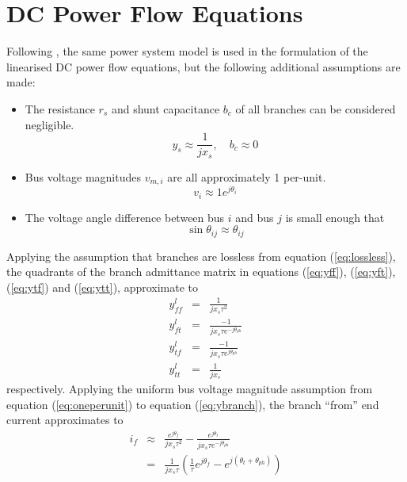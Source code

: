 \section{DC Power Flow Equations}
Following \cite[p.14]{pserc:mp_manual}, the same power system model is used in
the formulation of the linearised DC power flow equations, but the following additional assumptions are made:
\begin{itemize}
  \item The resistance $r_s$ and shunt capacitance $b_c$ of all branches can be
  considered negligible.
  \begin{equation}
  \label{eq:lossless}
  y_s \approx \frac{1}{jx_s}, \quad b_c \approx 0
  \end{equation}
  \item Bus voltage magnitudes $v_{m,i}$ are all approximately 1 per-unit.
  \begin{equation}
  \label{eq:oneperunit}
  v_i \approx 1e^{j\theta_i}
  \end{equation}
  \item The voltage angle difference between bus $i$ and bus $j$ is small enough
  that
  \begin{equation}
  \label{eq:busangdiff}
  \sin\theta_{ij} \approx \theta_{ij}
  \end{equation}
\end{itemize}
Applying the assumption that branches are lossless from equation
(\ref{eq:lossless}), the quadrants of the branch admittance matrix in equations
(\ref{eq:yff}), (\ref{eq:yft}), (\ref{eq:ytf}) and (\ref{eq:ytt}), approximate
to
\begin{eqnarray}
y_{ff}^l& =& \frac{1}{jx_s \tau^2}\\
y_{ft}^l& =& \frac{-1}{jx_s \tau e^{-j\theta_{ph}}}\\
y_{tf}^l& =& \frac{-1}{jx_s \tau e^{j\theta_{ph}}}\\
y_{tt}^l& =& \frac{1}{jx_s}
\end{eqnarray}
respectively.  Applying the uniform bus voltage magnitude assumption from
equation (\ref{eq:oneperunit}) to equation (\ref{eq:ybranch}), the branch
``from'' end current approximates to
\begin{eqnarray}
i_f& \approx& \frac{e^{j\theta_f}}{jx_s\tau^2} -
\frac{e^{j\theta_t}}{jx_s \tau e^{-j\theta_{ph}}}\\
& =& \frac{1}{jx_s\tau} ( \frac{1}{\tau}e^{j\theta_f} -
e^{j(\theta_t + \theta_{ph})} )
\end{eqnarray}
